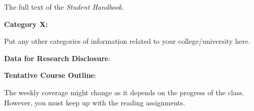 \documentclass[11pt]{article}
\begin{document}
The full text of the \emph{Student Handbook}.

\newpage

\textbf {\large Category X:}

\hspace{3mm}
\hangindent=5mm Put any other categories of information related to your college/university here. \

\textbf {\large Data for Research Disclosure}:


\newpage

\textbf {\large Tentative Course Outline}:

The weekly coverage might change as it depends on the progress of the class.  However, you must keep up with the reading assignments.

\normalsize %
\end{document}
